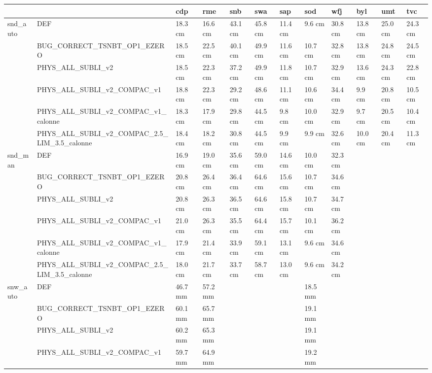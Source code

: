 \begin{tabular}{llllllllllll}
\toprule
 &  & cdp & rme & snb & swa & sap & sod & wfj & byl & umt & tvc \\
\midrule
\multirow[t]{6}{*}{snd_auto} & DEF & 18.3 cm & 16.6 cm & 43.1 cm & 45.8 cm & 11.4 cm & 9.6 cm & 30.8 cm & 13.8 cm & 25.0 cm & 24.3 cm \\
 & BUG_CORRECT_TSNBT_OP1_EZERO & 18.5 cm & 22.5 cm & 40.1 cm & 49.9 cm & 11.6 cm & 10.7 cm & 32.8 cm & 13.8 cm & 24.8 cm & 24.5 cm \\
 & PHYS_ALL_SUBLI_v2 & 18.5 cm & 22.3 cm & 37.2 cm & 49.9 cm & 11.8 cm & 10.7 cm & 32.9 cm & 13.6 cm & 24.3 cm & 22.8 cm \\
 & PHYS_ALL_SUBLI_v2_COMPAC_v1 & 18.8 cm & 22.3 cm & 29.2 cm & 48.6 cm & 11.1 cm & 10.6 cm & 34.4 cm & 9.9 cm & 20.8 cm & 10.5 cm \\
 & PHYS_ALL_SUBLI_v2_COMPAC_v1_calonne & 18.3 cm & 17.9 cm & 29.8 cm & 44.5 cm & 9.8 cm & 10.0 cm & 32.9 cm & 9.7 cm & 20.5 cm & 10.4 cm \\
 & PHYS_ALL_SUBLI_v2_COMPAC_2.5_LIM_3.5_calonne & 18.4 cm & 18.2 cm & 30.8 cm & 44.5 cm & 9.9 cm & 9.9 cm & 32.6 cm & 10.0 cm & 20.4 cm & 11.3 cm \\
\cline{1-12}
\multirow[t]{6}{*}{snd_man} & DEF & 16.9 cm & 19.0 cm & 35.6 cm & 59.0 cm & 14.6 cm & 10.0 cm & 32.3 cm &  &  &  \\
 & BUG_CORRECT_TSNBT_OP1_EZERO & 20.8 cm & 26.4 cm & 36.4 cm & 64.6 cm & 15.6 cm & 10.7 cm & 34.6 cm &  &  &  \\
 & PHYS_ALL_SUBLI_v2 & 20.8 cm & 26.3 cm & 36.5 cm & 64.6 cm & 15.8 cm & 10.7 cm & 34.7 cm &  &  &  \\
 & PHYS_ALL_SUBLI_v2_COMPAC_v1 & 21.0 cm & 26.3 cm & 35.5 cm & 64.4 cm & 15.7 cm & 10.1 cm & 36.2 cm &  &  &  \\
 & PHYS_ALL_SUBLI_v2_COMPAC_v1_calonne & 17.9 cm & 21.4 cm & 33.9 cm & 59.1 cm & 13.1 cm & 9.6 cm & 34.6 cm &  &  &  \\
 & PHYS_ALL_SUBLI_v2_COMPAC_2.5_LIM_3.5_calonne & 18.0 cm & 21.7 cm & 33.7 cm & 58.7 cm & 13.0 cm & 9.6 cm & 34.2 cm &  &  &  \\
\cline{1-12}
\multirow[t]{6}{*}{snw_auto} & DEF & 46.7 mm & 57.2 mm &  &  &  & 18.5 mm &  &  &  &  \\
 & BUG_CORRECT_TSNBT_OP1_EZERO & 60.1 mm & 65.7 mm &  &  &  & 19.1 mm &  &  &  &  \\
 & PHYS_ALL_SUBLI_v2 & 60.2 mm & 65.3 mm &  &  &  & 19.1 mm &  &  &  &  \\
 & PHYS_ALL_SUBLI_v2_COMPAC_v1 & 59.7 mm & 64.9 mm &  &  &  & 19.2 mm &  &  &  &  \\

\end{tabular}
